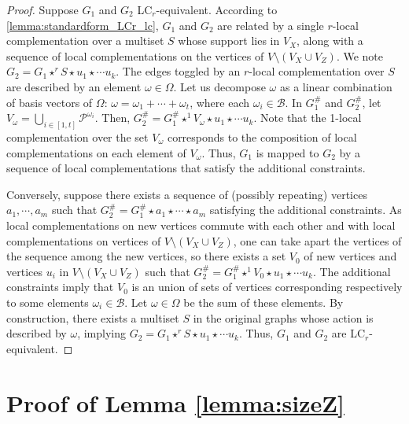 \documentclass[a4paper,UKenglish,cleveref,autoref,thm-restate]{arxiv}
\newcommand{\sm}{\setminus}
\begin{document}
\begin{proof}
    Suppose $G_1$ and $G_2$ LC$_r$-equivalent. According to \cref{lemma:standardform_LCr_lc}, $G_1$ and $G_2$ are related by a single $r$-local complementation over a multiset $S$ whose support lies in $V_X$, along with a sequence of local complementations on the vertices of $V \sm (V_X \cup V_Z)$. We note $G_2 = G_1 \star^r S \star u_1 \star \cdots u_k$. The edges toggled by an $r$-local complementation over $S$ are described by an element $\omega \in \Omega$. Let us decompose $\omega$ as a linear combination of basis vectors of $\Omega$: $\omega = \omega_1 + \cdots + \omega_t$, where each $\omega_i \in \mathcal B$. In $G^{\#}_1$ and $G^{\#}_2$, let $V_\omega = \bigcup_{i \in [1,t]} \mathcal P^{\omega_i}$.
    Then, $G^{\#}_2 = G^{\#}_1  \star^1 V_\omega \star u_1 \star \cdots u_k$. Note that the 1-local complementation over the set $V_\omega$ corresponds to the composition of local complementations on each element of $V_\omega$. Thus, $G_1$ is mapped to $G_2$ by a sequence of local complementations that satisfy the additional constraints.

    Conversely, suppose there exists a sequence of (possibly repeating) vertices $a_1, \cdots, a_m$ such that $G^{\#}_2 = G^{\#}_1 \star a_1 \star \cdots \star a_m$ satisfying the additional constraints. As local complementations on new vertices commute with each other and with local complementations on vertices of $V \sm (V_X \cup V_Z)$, one can take apart the vertices of the sequence among the new vertices, so there exists a set $V_0$ of new vertices and vertices $u_i$ in $V \sm (V_X \cup V_Z)$ such that $G^{\#}_2 = G^{\#}_1  \star^1 V_0 \star u_1 \star \cdots u_k$. The additional constraints imply that $V_0$ is an union of sets of vertices corresponding respectively to some elements $\omega_i \in \mathcal B$. Let $\omega \in \Omega$ be the sum of these elements. By construction, there exists a multiset $S$ in the original graphs whose action is described by $\omega$, implying $G_2 = G_1 \star^r S \star u_1 \star \cdots u_k$. Thus, $G_1$ and $G_2$ are LC$_r$-equivalent.
\end{proof}

\section{Proof of Lemma \ref{lemma:sizeZ}} \label{app:sizeZ}

\sizeZ*
\end{document}
